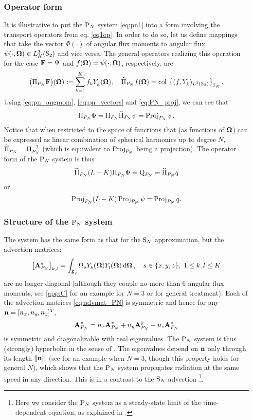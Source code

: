 \subsubsection{Operator form} \label{sec:pn_op}
It is illustrative to put the $\PN$ system \eqref{eq:pn1} into a form involving the transport operators from
eq. \eqref{eq1op}.
In order to do so, let us define mappings that take the vector $\Phi(\cdot)$ of angular flux moments to angular
flux $\psi(\cdot,\bomega)\in\Lp[2]_K(\Sphere)$ and vice versa. The general operators realizing this operation for the
case $\mat{F} = \Psi$ and $f(\bomega) = \psi(\cdot,\bomega)$, respectively, are
\begin{equation}\label{eq:pn_op_def}
\bigl(\PiPN\mat{F}\bigr)(\bomega) := \sum_{k=1}^{ K} f_k\Y{k}{}(\bomega), \quad
\PihPN f(\bomega) = \col \left\{(f, \Y{k}{})_{\Lp[2](\Sphere)}\right\}_{\idxset{K}}.
\end{equation} 
Using \eqref{eq:pn_angmom}, \eqref{eq:pn_vectors} and \eqref{eq:PN_proj}, we can see that 
$$
\PiPN\Phi = \PiPN\PihPN \psi = \Projop\psi.
$$ 
Notice that when restricted to the space of functions that (as functions of 
$\bomega$) can be expressed as linear combination of spherical harmonics up to degree $N$, $\PihPN = \PiPN^{-1}$  (which
is equivalent to $\Projop[P_N]$ being a projection). 
The operator form of the $\PN$ system is thus
\begin{equation}\label{eq:pn_op}
	\PihPN (L-K) \PiPN\Phi = \mathrm{Q}_{P_N} = \PihPN q
\end{equation}
or
\begin{equation}\label{eq:pn_op2}
	\Projop (L-K) \Projop\psi = \Projop q.
\end{equation}

\subsubsection{Structure of the $\PN$ system}
The system has the same form as that for the $\SN$ approximation, but the advection matrices:
\begin{equation}\label{eq:advmat_PN}
	\left[\mat{A}_{P_N}^s\right]_{k,l} = \intA{\Omega_s \Y{k}{}(\bomega)\Yc{l}{}(\bomega)},\quad s\in\{x,y,z\},\ 
	1 \leq k,l \leq  K
\end{equation}
are no longer diagonal (although they couple no more than 6 angular flux moments, see \ref{app:C} for an example for $N
= 3$ or \cite[App. A]{Sanchez8} for general treatment). Each of the advection matrices \eqref{eq:advmat_PN} 
is symmetric and hence for any $\bn = [n_x,n_y,n_z]^T$, 
$$
	\mat{A}_{P_N}^{\bn} = n_x \mat{A}_{P_N}^x + n_y \mat{A}_{P_N}^y + n_z \mat{A}_{P_N}^z
$$
is symmetric and diagonalizable with real eigenvalues. The $\PN$ system is thus (strongly) hyperbolic in the sense of 
\cite[Def. 18.1]{leveque}. The eigenvalues depend on 
$\bn$ only through its length $\norm{\bn}$ (see  for an example when $N = 3$,  though this property
holds for general $N$), which shows that the $\PN$ system propagates radiation at the same speed in any
direction. This is in a contrast to the $\SN$ advection \footnote{Here we consider the $\PN$ system as a steady-state
limit of the time-dependent equation, as explained in \sref{app:C}.}.

